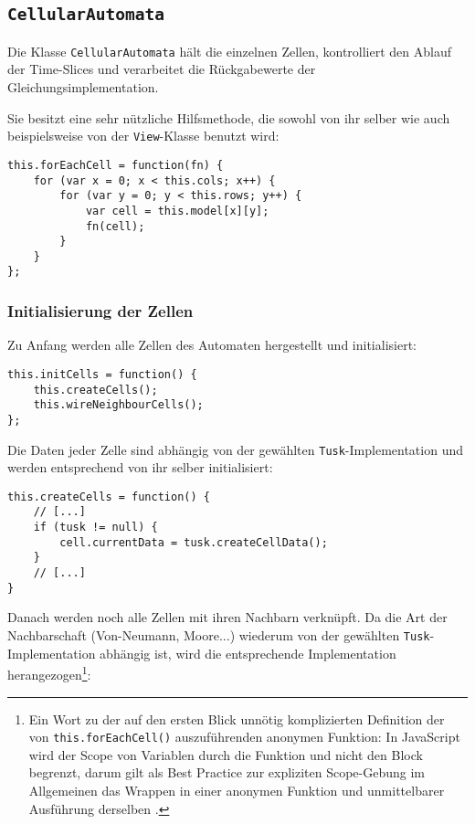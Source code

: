 \documentclass[11pt]{article} %
\theoremstyle{definition}
\begin{document}
\subsection{\tt CellularAutomata}

Die Klasse {\tt CellularAutomata} hält die einzelnen Zellen, kontrolliert den Ablauf der Time-Slices und verarbeitet die Rückgabewerte der Gleichungsimplementation.

Sie besitzt eine sehr nützliche Hilfsmethode, die sowohl von ihr selber wie auch beispielsweise von der {\tt View}-Klasse benutzt wird:

\begin{lstlisting}
this.forEachCell = function(fn) {
	for (var x = 0; x < this.cols; x++) {
		for (var y = 0; y < this.rows; y++) {
			var cell = this.model[x][y];
			fn(cell);
		}
	}
};
\end{lstlisting}

\subsubsection{Initialisierung der Zellen}

Zu Anfang werden alle Zellen des Automaten hergestellt und initialisiert:
\begin{lstlisting}
this.initCells = function() {
	this.createCells();
	this.wireNeighbourCells();
};
\end{lstlisting}

Die Daten jeder Zelle sind abhängig von der gewählten {\tt Tusk}-Implementation und werden entsprechend von ihr selber initialisiert:

\begin{lstlisting}
this.createCells = function() {
	// [...]
	if (tusk != null) {
		cell.currentData = tusk.createCellData();
	}
	// [...]
}
\end{lstlisting}

Danach werden noch alle Zellen mit ihren Nachbarn verknüpft. Da die Art der Nachbarschaft (Von-Neumann, Moore...) wiederum von der gewählten {\tt Tusk}-Implementation abhängig ist, wird die entsprechende Implementation herangezogen\footnote{Ein Wort zu der auf den ersten Blick unnötig komplizierten Definition der von {\tt this.forEachCell()} auszuführenden anonymen Funktion: In JavaScript wird der Scope von Variablen durch die Funktion und nicht den Block begrenzt, darum gilt als Best Practice zur expliziten Scope-Gebung im Allgemeinen das Wrappen in einer anonymen Funktion und unmittelbarer Ausführung derselben \cite{UnderstandingClosures}.}:
\end{document}
